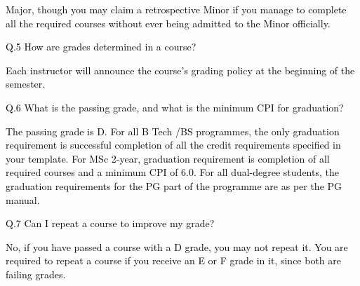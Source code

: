 \documentclass[12pt]{article}
\begin{document}
\vspace{\baselineskip}
\begin{justify}
{\fontsize{10pt}{12.0pt}\selectfont \textcolor[HTML]{00000A}{Major, though you may claim a retrospective Minor if you manage to complete all the required courses without ever being admitted to the Minor officially.}\par}
\end{justify}\par


\vspace{\baselineskip}
{\fontsize{10pt}{12.0pt}\selectfont \textcolor[HTML]{00000A}{Q.5 How are grades determined in a course?}\par}\par


\vspace{\baselineskip}
{\fontsize{10pt}{12.0pt}\selectfont \textcolor[HTML]{00000A}{Each instructor will announce the course's grading policy at the beginning of the semester.}\par}\par


\vspace{\baselineskip}
{\fontsize{10pt}{12.0pt}\selectfont \textcolor[HTML]{00000A}{Q.6 What is the passing grade, and what is the minimum CPI for graduation?}\par}\par


\vspace{\baselineskip}
\begin{justify}
{\fontsize{10pt}{12.0pt}\selectfont \textcolor[HTML]{00000A}{The passing grade is D. For all B Tech /BS programmes, the only graduation requirement is successful completion of all the credit requirements specified in your template. For MSc 2-year, graduation requirement is completion of all required courses and a minimum CPI of 6.0. For all dual-degree students, the graduation requirements for the PG part of the programme are as per the PG manual.}\par}
\end{justify}\par


\vspace{\baselineskip}
{\fontsize{10pt}{12.0pt}\selectfont \textcolor[HTML]{00000A}{Q.7 Can I repeat a course to improve my grade?}\par}\par


\vspace{\baselineskip}
\begin{adjustwidth}{0.0in}{0.01in}
\begin{justify}
{\fontsize{10pt}{12.0pt}\selectfont \textcolor[HTML]{00000A}{No, if you have passed a course with a D grade, you may not repeat it. You are required to repeat a course if you receive an E or F grade in it, since both are failing grades.}\par}
\end{justify}\par

\end{adjustwidth}
\end{document}
